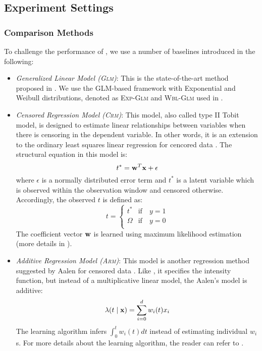 \subsection{Experiment Settings}
\subsubsection{Comparison Methods}
To challenge the performance of \npglm, we use a number of baselines introduced in the following:

\begin{itemize}
\item \emph{Generalized Linear Model (\textsc{Glm})}: This is the state-of-the-art method proposed in \cite{sun2012will}. We use the GLM-based framework with Exponential and Weibull distributions, denoted as \textsc{Exp-Glm} and \textsc{Wbl-Glm} used in \cite{sun2012will}.

\item \emph{Censored Regression Model (\textsc{Crm})}: This model, also called type II Tobit model, is designed to estimate linear relationships between variables when there is censoring in the dependent variable. In other words, it is an extension to the ordinary least squares linear regression for cencored data \cite{tobit}. The structural equation in this model is:
\[ t^*=\mathbf{w}^T\mathbf{x}+\epsilon \]
where $\epsilon$ is a normally distributed error term and $t^*$ is a latent variable which is observed within the observation window and censored otherwise. Accordingly, the observed $t$ is defined as:
\[ t=\begin{cases}
t^* & \text{if}\quad y=1 \\
\Omega & \text{if}\quad y=0\\
\end{cases} \]
The coefficient vector $\mathbf{w}$ is learned using maximum likelihood estimation (more details in \cite{amemiya1984tobit}).
\item \emph{Additive Regression Model (\textsc{Arm})}: This model is another regression method suggested by Aalen for censored data \cite{aalen1989linear}. Like \npglm, it specifies the intensity function, but instead of a multiplicative linear model, the Aalen's model is additive:
\[\lambda(t\mid \mathbf{x})=\sum_{i=0}^dw_i(t)x_i \]
The learning algorithm infers $\int_{0}^{t}w_i(t)dt$ instead of estimating individual $w_i$s. 
For more details about the learning algorithm, the reader can refer to \cite{hosmer2011applied}.

\end{itemize}

